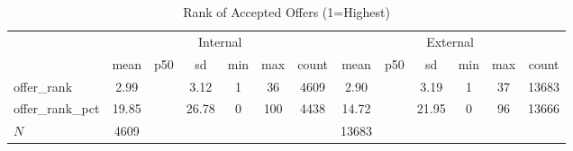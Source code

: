 \begin{table}[htbp]\centering
\def\sym#1{\ifmmode^{#1}\else\(^{#1}\)\fi}
\caption{Rank of Accepted Offers (1=Highest)}
\begin{tabular}{l*{2}{cccccc}}
\hline\hline
            &\multicolumn{6}{c}{Internal}                                                 &\multicolumn{6}{c}{External}                                                 \\
            &        mean&         p50&          sd&         min&         max&       count&        mean&         p50&          sd&         min&         max&       count\\
\hline
offer\_rank  &        2.99&            &        3.12&           1&          36&        4609&        2.90&            &        3.19&           1&          37&       13683\\
offer\_rank\_pct&       19.85&            &       26.78&           0&         100&        4438&       14.72&            &       21.95&           0&          96&       13666\\
\hline
\(N\)       &        4609&            &            &            &            &            &       13683&            &            &            &            &            \\
\hline\hline
\end{tabular}
\end{table}
